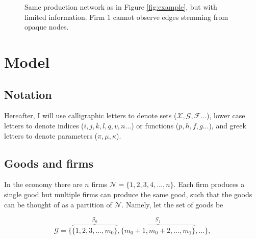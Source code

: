 \documentclass[american, abstract=on]{scrartcl}
\newcommand{\inputTikZ}[2]{%
      \scalebox{#1}{}  
    }
\newcommand{\F}{\mathcal{F}}
\newcommand{\X}{\mathcal{X}}
\newcommand{\G}{\mathcal{G}}
\newcommand{\N}{\mathcal{N}}
\newcommand{\citein}[1]{\citeauthor{#1} (\citeyear{#1})}
\newcommand\notes[1]{\textcolor{teal}{\textbf{#1}}}
\begin{document}
\begin{figure}[H]
  \centering
  \inputTikZ{0.5}{diagrams/example-limited.tikz} 
  \caption{Same production network as in Figure \ref{fig:example}, but with limited information. Firm $1$ cannot observe edges stemming from opaque nodes.}
  \label{fig:example:unknown}  
\end{figure}

\iffalse


\section{Literature review}

The model presented here introduces insights from the literature of games on networks and learning on networks to the macroeconomic literature on endogenous production network.

Particularly relevant are the models developed by \citein{dasaratha_bayesian_2018} and \citein{dasaratha_learning_2021} where agents observe neighbours characteristics to learn about a latent network state.   

\notes{TODO: I collected the relevant papers, need to complete this section}

\fi

\section{Model}

\subsection{Notation}

Hereafter, I will use calligraphic letters to denote sets ($\X, \G, \F \ldots$), lower case letters to denote indices ($i, j, k, l, q, v, n \ldots$) or functions ($p, h, f, g \ldots$), and greek letters to denote parameters ($\pi, \mu, \kappa$).

\subsection{Goods and firms}

In the economy there are $n$ firms $\N = \{1, 2, 3, 4, \ldots, n \}$. Each firm produces a single good but multiple firms can produce the same good, such that the goods can be thought of as a partition of $\N$. Namely, let the set of goods be

\begin{equation}
    \G = \{ \overbrace{\{1, 2, 3, \ldots, m_0\}}^{\G_0},  \overbrace{\{m_0 + 1, m_0 + 2, \ldots, m_1\}}^{\G_1}, \ldots \},
\end{equation}
\end{document}
